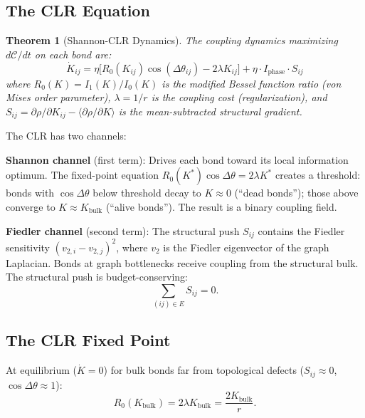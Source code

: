 \documentclass[aps,prd,onecolumn,superscriptaddress,floatfix,12pt]{revtex4-2}
\newcommand{\Rzero}{R_0}
\newcommand{\Kbulk}{K_{\text{bulk}}}
\newcommand{\Iphase}{I_{\text{phase}}}
\newtheorem{theorem}{Theorem}[section]
\begin{document}
\subsection{The CLR Equation}\label{sec:2-2}

\begin{theorem}[Shannon-CLR Dynamics]\label{thm:clr}
The coupling dynamics maximizing $d\mathcal{C}/dt$ on each bond are:
\begin{equation}\label{eq:clr}
\boxed{\dot{K}_{ij} = \eta\bigl[\Rzero(K_{ij})\cos(\Delta\theta_{ij}) - 2\lambda K_{ij}\bigr] + \eta \cdot \Iphase \cdot S_{ij}}
\end{equation}
where $\Rzero(K) = I_1(K)/I_0(K)$ is the modified Bessel function ratio (von Mises order parameter), $\lambda = 1/r$ is the coupling cost (regularization), and $S_{ij} = \partial\rho/\partial K_{ij} - \langle\partial\rho/\partial K\rangle$ is the mean-subtracted structural gradient.
\end{theorem}

The CLR has two channels:

\textbf{Shannon channel} (first term): Drives each bond toward its local information optimum. The fixed-point equation $\Rzero(K^*)\cos\Delta\theta = 2\lambda K^*$ creates a threshold: bonds with $\cos\Delta\theta$ below threshold decay to $K \approx 0$ (``dead bonds''); those above converge to $K \approx \Kbulk$ (``alive bonds''). The result is a binary coupling field.

\textbf{Fiedler channel} (second term): The structural push $S_{ij}$ contains the Fiedler sensitivity $(v_{2,i} - v_{2,j})^2$, where $v_2$ is the Fiedler eigenvector of the graph Laplacian. Bonds at graph bottlenecks receive coupling from the structural bulk. The structural push is budget-conserving:
\begin{equation}\label{eq:budget}
\sum_{(ij) \in E} S_{ij} = 0.
\end{equation}

\subsection{The CLR Fixed Point}\label{sec:2-3}

At equilibrium ($\dot{K} = 0$) for bulk bonds far from topological defects ($S_{ij} \approx 0$, $\cos\Delta\theta \approx 1$):
\begin{equation}\label{eq:fixedpt}
\Rzero(\Kbulk) = 2\lambda \Kbulk = \frac{2\Kbulk}{r}.
\end{equation}
\end{document}
